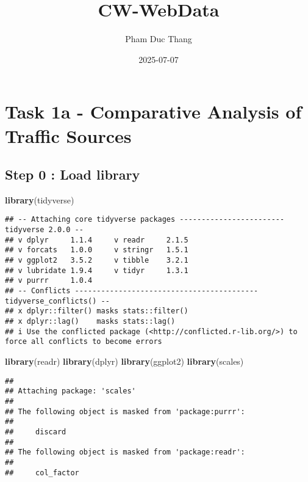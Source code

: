 \documentclass[
]{article}
\title{CW-WebData}
\author{Pham Duc Thang}
\date{2025-07-07}
\newenvironment{Shaded}{\begin{snugshade}}{\end{snugshade}}
\newcommand{\FunctionTok}[1]{\textcolor[rgb]{0.13,0.29,0.53}{\textbf{#1}}}
\newcommand{\NormalTok}[1]{#1}
\begin{document}
\maketitle

\section{Task 1a - Comparative Analysis of Traffic
Sources}\label{task-1a---comparative-analysis-of-traffic-sources}

\subsection{Step 0 : Load library}\label{step-0-load-library}

\begin{Shaded}
\begin{Highlighting}[]
\FunctionTok{library}\NormalTok{(tidyverse)}
\end{Highlighting}
\end{Shaded}

\begin{verbatim}
## -- Attaching core tidyverse packages ------------------------ tidyverse 2.0.0 --
## v dplyr     1.1.4     v readr     2.1.5
## v forcats   1.0.0     v stringr   1.5.1
## v ggplot2   3.5.2     v tibble    3.2.1
## v lubridate 1.9.4     v tidyr     1.3.1
## v purrr     1.0.4     
## -- Conflicts ------------------------------------------ tidyverse_conflicts() --
## x dplyr::filter() masks stats::filter()
## x dplyr::lag()    masks stats::lag()
## i Use the conflicted package (<http://conflicted.r-lib.org/>) to force all conflicts to become errors
\end{verbatim}

\begin{Shaded}
\begin{Highlighting}[]
\FunctionTok{library}\NormalTok{(readr)}
\FunctionTok{library}\NormalTok{(dplyr)}
\FunctionTok{library}\NormalTok{(ggplot2)}
\FunctionTok{library}\NormalTok{(scales)}
\end{Highlighting}
\end{Shaded}

\begin{verbatim}
## 
## Attaching package: 'scales'
## 
## The following object is masked from 'package:purrr':
## 
##     discard
## 
## The following object is masked from 'package:readr':
## 
##     col_factor
\end{verbatim}
\end{document}
